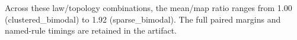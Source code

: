 Across these law/topology combinations, the mean/map ratio ranges from 1.00 (clustered\_bimodal) to 1.92 (sparse\_bimodal). The full paired margins and named-rule timings are retained in the artifact.
